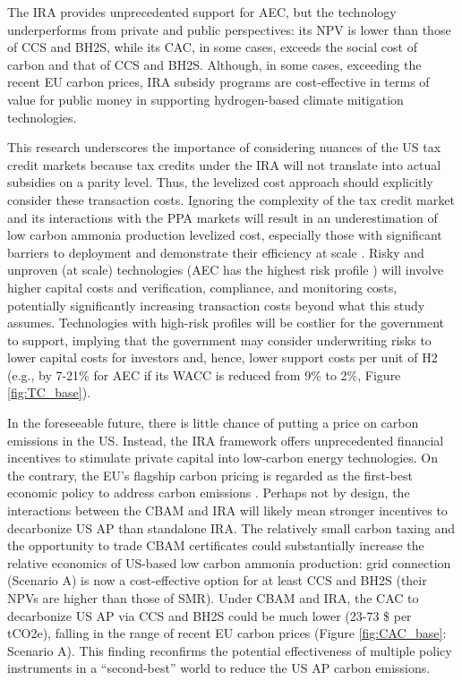 \documentclass{article}
\begin{document}
The IRA provides unprecedented support for AEC, but the technology underperforms from private and public perspectives: its NPV is lower than those of CCS and BH2S, while its CAC, in some cases, exceeds the social cost of carbon and that of CCS and BH2S. Although, in some cases, exceeding the recent EU carbon prices, IRA subsidy programs are cost-effective in terms of value for public money in supporting hydrogen-based climate mitigation technologies.

This research underscores the importance of considering nuances of the US tax credit markets because tax credits under the IRA will not translate into actual subsidies on a parity level. Thus, the levelized cost approach should explicitly consider these transaction costs. Ignoring the complexity of the tax credit market and its interactions with the PPA markets will result in an underestimation of low carbon ammonia production levelized cost, especially those with significant barriers to deployment and demonstrate their efficiency at scale \cite{Kahn1996, Barradale2010, Abolhosseini2014}. Risky and unproven (at scale) technologies (AEC has the highest risk profile ) will involve higher capital costs and verification, compliance, and monitoring costs, potentially significantly increasing transaction costs beyond what this study assumes. Technologies with high-risk profiles will be costlier for the government to support, implying that the government may consider underwriting risks to lower capital costs for investors and, hence, lower support costs per unit of H2 (e.g., by 7-21\%  for AEC if its WACC is reduced from 9\% to 2\%, Figure \ref{fig:TC_base}).

In the foreseeable future, there is little chance of putting a price on carbon emissions in the US. Instead, the IRA framework offers unprecedented financial incentives to stimulate private capital into low-carbon energy technologies. On the contrary, the EU’s flagship carbon pricing is regarded as the first-best economic policy to address carbon emissions \cite{Nordhaus1992, Nordhaus1994, Stavins1997, Stavins2008, Stern2006}. Perhaps not by design, the interactions between the CBAM and IRA will likely mean stronger incentives to decarbonize US AP than standalone IRA. The relatively small carbon taxing and the opportunity to trade CBAM certificates could substantially increase the relative economics of US-based low carbon ammonia production: grid connection (Scenario A) is now a cost-effective option for at least CCS and BH2S (their NPVs are higher than those of SMR). Under CBAM and IRA, the CAC to decarbonize US AP via CCS and BH2S could be much lower (23-73 \$ per  tCO2e), falling in the range of recent EU carbon prices (Figure \ref{fig:CAC_base}: Scenario A). This finding reconfirms the potential effectiveness of multiple policy instruments in a “second-best” world \cite{Bennear2007, Sorrell2003, Lehmann2012, Stavins2008} to reduce the US AP carbon emissions.
\end{document}
